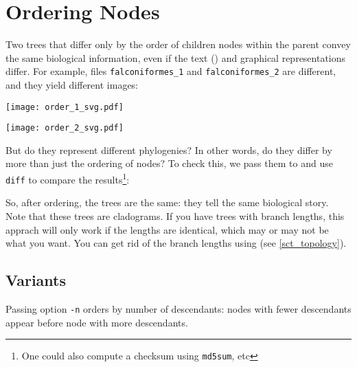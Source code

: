 \section{Ordering Nodes}
\label{sct_order}

Two trees that differ only by the order of children nodes within the parent
convey the same biological information, even if the text (\nw) and graphical
representations differ.  For example, files \texttt{falconiformes\_1} and
\texttt{falconiformes\_2} are different, and they yield different images:


\begin{center}
\texttt{[image: order\_1\_svg.pdf]}
\end{center}


\begin{center}
\texttt{[image: order\_2\_svg.pdf]}
\end{center}

\noindent{}But do they represent different phylogenies? In other words, do they
differ by more than just the ordering of nodes? To check this, we pass them to
\order{} and use \texttt{diff} to compare the results\footnote{One could also compute a checksum using \texttt{md5sum}, etc}:




So, after ordering, the trees are the same: they tell the same biological
story. Note that these trees are cladograms. If you have trees with branch
lengths, this apprach will only work if the lengths are identical, which may or
may not be what you want. You can get rid of the branch lengths using
\topology{} (see \ref{sct_topology}).

\subsection{Variants}

Passing option \texttt{-n} orders by number of descendants: nodes with fewer
descendants appear before node with more descendants.
